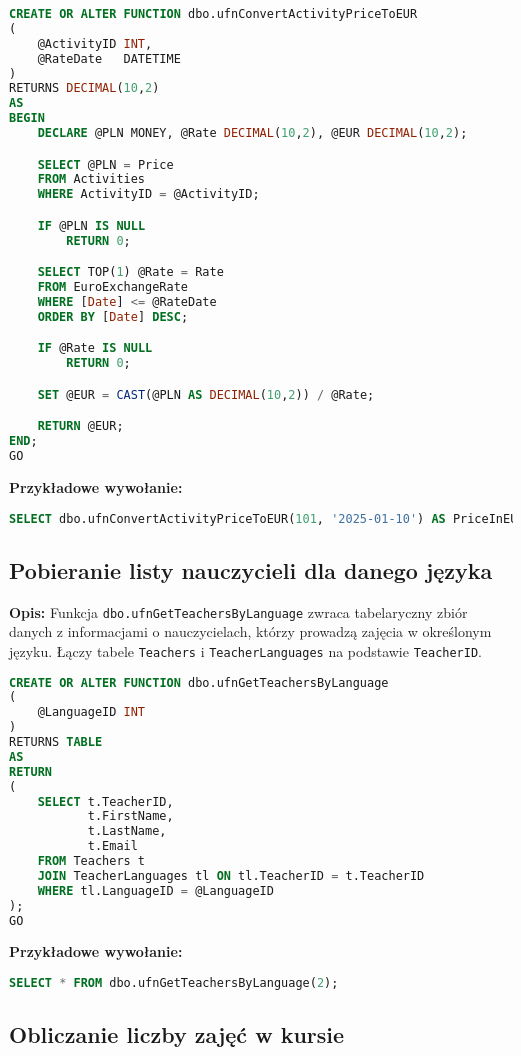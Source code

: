 \documentclass[12pt]{article}
\begin{document}
 
\begin{lstlisting}[language=SQL]
CREATE OR ALTER FUNCTION dbo.ufnConvertActivityPriceToEUR
(
    @ActivityID INT,
    @RateDate   DATETIME
)
RETURNS DECIMAL(10,2)
AS
BEGIN
    DECLARE @PLN MONEY, @Rate DECIMAL(10,2), @EUR DECIMAL(10,2);

    SELECT @PLN = Price 
    FROM Activities
    WHERE ActivityID = @ActivityID;

    IF @PLN IS NULL
        RETURN 0;

    SELECT TOP(1) @Rate = Rate
    FROM EuroExchangeRate
    WHERE [Date] <= @RateDate
    ORDER BY [Date] DESC; 

    IF @Rate IS NULL
        RETURN 0;

    SET @EUR = CAST(@PLN AS DECIMAL(10,2)) / @Rate;

    RETURN @EUR;
END;
GO
\end{lstlisting}

\textbf{Przykładowe wywołanie:}
\begin{lstlisting}[language=SQL]
SELECT dbo.ufnConvertActivityPriceToEUR(101, '2025-01-10') AS PriceInEUR;
\end{lstlisting}
\newpage
\subsection{Pobieranie listy nauczycieli dla danego języka}
\label{sec:teachers_by_language}

\textbf{Opis:} Funkcja \texttt{dbo.ufnGetTeachersByLanguage} zwraca tabelaryczny zbiór danych z informacjami o nauczycielach, którzy prowadzą zajęcia w określonym języku. Łączy tabele \texttt{Teachers} i \texttt{TeacherLanguages} na podstawie \texttt{TeacherID}.

 
\begin{lstlisting}[language=SQL]
CREATE OR ALTER FUNCTION dbo.ufnGetTeachersByLanguage
(
    @LanguageID INT
)
RETURNS TABLE
AS
RETURN
(
    SELECT t.TeacherID,
           t.FirstName,
           t.LastName,
           t.Email
    FROM Teachers t
    JOIN TeacherLanguages tl ON tl.TeacherID = t.TeacherID
    WHERE tl.LanguageID = @LanguageID
);
GO
\end{lstlisting}

\textbf{Przykładowe wywołanie:}
\begin{lstlisting}[language=SQL]
SELECT * FROM dbo.ufnGetTeachersByLanguage(2);
\end{lstlisting}
\subsection{Obliczanie liczby zajęć w kursie}
\label{sec:course_total_hours}
\end{document}
